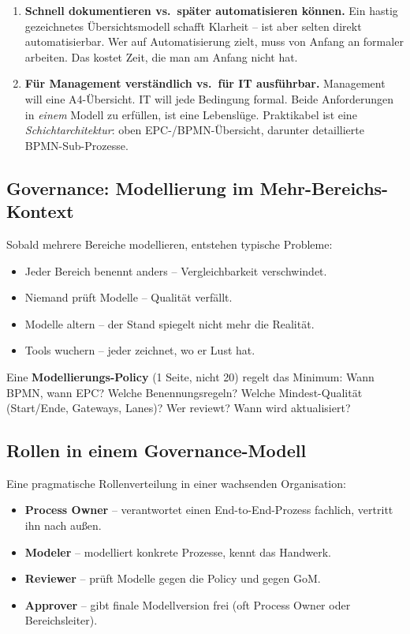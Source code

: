 \documentclass[11pt,a4paper,oneside]{article}
\newcommand{\fachbegriff}[1]{\textbf{#1}}
\begin{document}
\begin{enumerate}
  \item \textbf{Schnell dokumentieren vs.\ später automatisieren können.} Ein hastig gezeichnetes Übersichtsmodell schafft Klarheit -- ist aber selten direkt automatisierbar. Wer auf Automatisierung zielt, muss von Anfang an formaler arbeiten. Das kostet Zeit, die man am Anfang nicht hat.
  \item \textbf{Für Management verständlich vs.\ für IT ausführbar.} Management will eine A4-Übersicht. IT will jede Bedingung formal. Beide Anforderungen in \emph{einem} Modell zu erfüllen, ist eine Lebenslüge. Praktikabel ist eine \emph{Schichtarchitektur}: oben EPC-/BPMN-Übersicht, darunter detaillierte BPMN-Sub-Prozesse.
\end{enumerate}

\subsection{Governance: Modellierung im Mehr-Bereichs-Kontext}

Sobald mehrere Bereiche modellieren, entstehen typische Probleme:

\begin{itemize}
  \item Jeder Bereich benennt anders -- Vergleichbarkeit verschwindet.
  \item Niemand prüft Modelle -- Qualität verfällt.
  \item Modelle altern -- der Stand spiegelt nicht mehr die Realität.
  \item Tools wuchern -- jeder zeichnet, wo er Lust hat.
\end{itemize}

Eine \fachbegriff{Modellierungs-Policy} (1 Seite, nicht 20) regelt das Minimum: Wann BPMN, wann EPC? Welche Benennungsregeln? Welche Mindest-Qualität (Start/Ende, Gateways, Lanes)? Wer reviewt? Wann wird aktualisiert?

\subsection{Rollen in einem Governance-Modell}

Eine pragmatische Rollenverteilung in einer wachsenden Organisation:

\begin{itemize}
  \item \fachbegriff{Process Owner} -- verantwortet einen End-to-End-Prozess fachlich, vertritt ihn nach außen.
  \item \fachbegriff{Modeler} -- modelliert konkrete Prozesse, kennt das Handwerk.
  \item \fachbegriff{Reviewer} -- prüft Modelle gegen die Policy und gegen GoM.
  \item \fachbegriff{Approver} -- gibt finale Modellversion frei (oft Process Owner oder Bereichsleiter).
\end{itemize}
\end{document}
